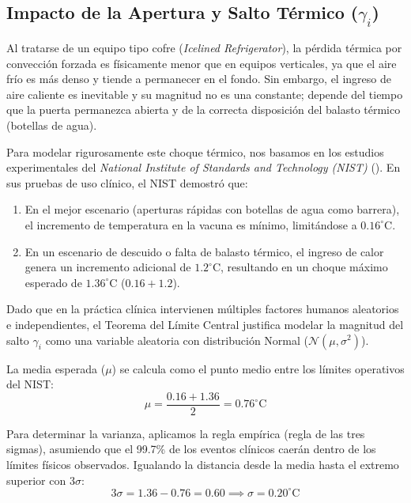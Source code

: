 \documentclass[
  spanish,
  us-letterpaper,
]{scrreprt}
\providecommand{\tightlist}{%
  \setlength{\itemsep}{0pt}\setlength{\parskip}{0pt}}
\numberwithin{equation}{section}
\theoremstyle{plain}
\theoremstyle{plain}
\theoremstyle{plain}
\theoremstyle{definition}
\theoremstyle{remark}
\begin{document}
\subsection{\texorpdfstring{Impacto de la Apertura y Salto Térmico
(\(\gamma_i\))}{Impacto de la Apertura y Salto Térmico (\textbackslash gamma\_i)}}\label{sec-salto-termico}

Al tratarse de un equipo tipo cofre (\emph{Icelined Refrigerator}), la
pérdida térmica por convección forzada es físicamente menor que en
equipos verticales, ya que el aire frío es más denso y tiende a
permanecer en el fondo. Sin embargo, el ingreso de aire caliente es
inevitable y su magnitud no es una constante; depende del tiempo que la
puerta permanezca abierta y de la correcta disposición del balasto
térmico (botellas de agua).

Para modelar rigurosamente este choque térmico, nos basamos en los
estudios experimentales del \emph{National Institute of Standards and
Technology (NIST)} (). En sus pruebas de uso clínico, el NIST demostró que:

\begin{enumerate}
\def\labelenumi{\arabic{enumi}.}
\tightlist
\item
  En el mejor escenario (aperturas rápidas con botellas de agua como
  barrera), el incremento de temperatura en la vacuna es mínimo,
  limitándose a \textbf{\(0.16^\circ\text{C}\)}.
\item
  En un escenario de descuido o falta de balasto térmico, el ingreso de
  calor genera un incremento adicional de \(1.2^\circ\text{C}\),
  resultando en un choque máximo esperado de
  \textbf{\(1.36^\circ\text{C}\)} (\(0.16 + 1.2\)).
\end{enumerate}

Dado que en la práctica clínica intervienen múltiples factores humanos
aleatorios e independientes, el Teorema del Límite Central justifica
modelar la magnitud del salto \(\gamma_i\) como una variable aleatoria
con distribución Normal (\(\mathcal{N}(\mu, \sigma^2)\)).

La media esperada (\(\mu\)) se calcula como el punto medio entre los
límites operativos del NIST:
\[\mu = \frac{0.16 + 1.36}{2} = 0.76^\circ\text{C}\]

Para determinar la varianza, aplicamos la regla empírica (regla de las
tres sigmas), asumiendo que el 99.7\% de los eventos clínicos caerán
dentro de los límites físicos observados. Igualando la distancia desde
la media hasta el extremo superior con \(3\sigma\):
\[3\sigma = 1.36 - 0.76 = 0.60 \implies \sigma = 0.20^\circ\text{C}\]
\end{document}
